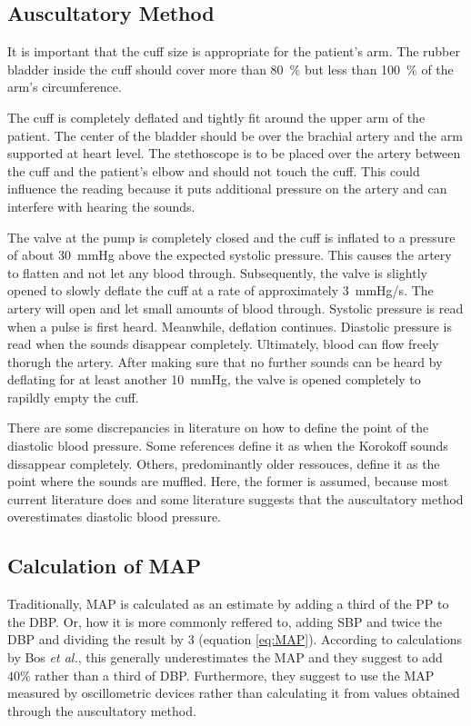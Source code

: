 \subsection{Auscultatory Method}
It is important that the cuff size is appropriate for the patient's arm. The rubber bladder inside the cuff should cover more than \SI{80}{\%} but less than \SI{100}{\%} of the arm's circumference.

The cuff is completely deflated and tightly fit around the upper arm of the patient. The center of the bladder should be over the brachial artery and the arm supported at heart level. The stethoscope is to be placed over the artery between the cuff and the patient's elbow and should not touch the cuff. This could influence the reading because it puts additional pressure on the artery and can interfere with hearing the sounds.\cite{NHS2019}\cite{Reeves1995}

The valve at the pump is completely closed and the cuff is inflated to a pressure of about \SI{30}{\mmHg} above the expected systolic pressure. This causes the artery to flatten and not let any blood through. Subsequently, the valve is slightly opened to slowly deflate the cuff at a rate of approximately \SI{3}{\mmHg/\second}. The artery will open and let small amounts of blood through. Systolic pressure is read when a pulse is first heard. Meanwhile, deflation continues. Diastolic pressure is read when the sounds disappear completely. Ultimately, blood can flow freely thorugh the artery. After making sure that no further sounds can be heard by deflating for at least another \SI{10}{\mmHg}, the valve is opened completely to rapildly empty the cuff.   \cite{NHS2019,Reeves1995}

There are some discrepancies in literature on how to define the point of the diastolic blood pressure. Some references define it as when the Korokoff sounds dissappear completely. \cite{NHS2019,Reeves1995} Others, predominantly older ressouces, define it as the point where the sounds are muffled.\cite{Boron2012} Here, the former is assumed, because most current literature does and some literature suggests that the auscultatory method overestimates diastolic blood pressure. \cite{Chandrasekhar2019} 

\subsection{Calculation of MAP}
Traditionally, MAP is calculated as an estimate by adding a third of the PP to the DBP. Or, how it is more commonly reffered to, adding SBP and twice the DBP and dividing the result by 3 (equation \ref{eq:MAP}). According to calculations by Bos \textit{et al.}, this generally underestimates the MAP and they suggest to add $40\%$ rather than a third of DBP. Furthermore, they suggest to use the MAP measured by oscillometric devices rather than calculating it from values obtained through the auscultatory method. \cite{Bos2007}

